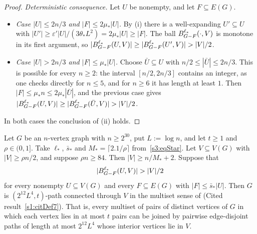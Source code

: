 \begin{proof}
\emph{Deterministic consequence.} Let $U$ be nonempty, and let
$F\subseteq E(G)$.
\begin{itemize}
\item \emph{Case $|U|\le2n/3$ and $|F|\le2\mu_*|U|$.} By (i) there is a
  well-expanding $U'\subseteq U$ with
  $|U'|\ge\varepsilon'|U|/(3\theta_*L^2)=2\mu_*|U|\ge|F|$. The ball
  $B^{\ell_*}_{G-F}(\cdot,V)$ is monotone in its first argument, so
  $|\Ball{\ell_*}{G-F}{U,V}|\ge|\Ball{\ell_*}{G-F}{U',V}|>|V|/2$.
\item \emph{Case $|U|>2n/3$ and $|F|\le\mu_*|U|$.} Choose
  $\bar U\subseteq U$ with $n/2\le|\bar U|\le2n/3$. This is possible
  for every $n\ge2$: the interval $[n/2,2n/3]$ contains an integer, as
  one checks directly for $n\le5$, and for $n\ge6$ it has length at
  least $1$. Then $|F|\le\mu_*n\le2\mu_*|\bar U|$, and the previous case
  gives $|\Ball{\ell_*}{G-F}{U,V}|\ge|\Ball{\ell_*}{G-F}{\bar U,V}|>|V|/2$.
\end{itemize}
In both cases the conclusion of (ii) holds.
\end{proof}

\begin{lemma}\label{s3:lemL9rho}
Let $G$ be an $n$-vertex graph with $n\ge2^{30}$, put $L:=\log n$, and
let $t\ge1$ and $\rho\in(0,1]$. Take $\ell_*$, $\bar s_*$ and
$M_*=\lceil2.1/\rho\rceil$ from~\eqref{s3:eqStar}. Let $V\subseteq V(G)$
with $|V|\ge\rho n/2$, and suppose $\rho n\ge84$. Then
$|V|\ge n/M_*+2$. Suppose that
\[
|\Ball{\ell_*}{G-F}{U,V}|>|V|/2
\]
for every nonempty $U\subseteq V(G)$ and every $F\subseteq E(G)$ with
$|F|\le\bar s_*|U|$. Then $G$ is $(2^{12}L^4,t)$-path connected through
$V$ in the multiset sense of \cite[Definition~7]{BM}
(Cited result~\ref{s1:citDef7}). That is, every multiset of pairs of distinct
vertices of $G$ in which each vertex lies in at most $t$ pairs can be
joined by pairwise edge-disjoint paths of length at most $2^{12}L^4$
whose interior vertices lie in $V$.
\deps{\ref{s1:citLem9}, \ref{s1:citProp8}, \ref{s1:citHaxell}, \ref{s1:citDef7}, \ref{s3:remMultiset}}
\end{lemma}

